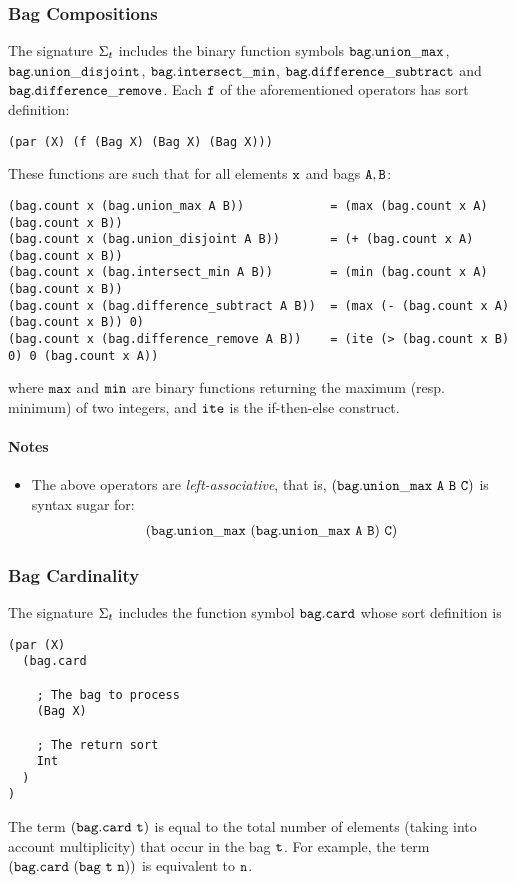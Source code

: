 \documentclass[english,a4paper,10pt]{article}
\begin{document}
\subsubsection{Bag Compositions}
\label{sec:bag-compositions}
The signature $\Sigma_{t}$ includes 
the binary function symbols 
${\tt bag.union\_max}$, ${\tt bag.union\_disjoint}$, 
${\tt bag.intersect\_min}$, ${\tt bag.difference\_subtract}$ and
${\tt bag.difference\_remove}$.
Each ${\tt f}$ of the aforementioned operators
has sort definition:
\begin{verbatim}
(par (X) (f (Bag X) (Bag X) (Bag X)))
\end{verbatim}
These functions are such that for all elements ${\tt x}$
and bags ${\tt A,B}$:
\begin{verbatim}
(bag.count x (bag.union_max A B))            = (max (bag.count x A) (bag.count x B))
(bag.count x (bag.union_disjoint A B))       = (+ (bag.count x A) (bag.count x B))
(bag.count x (bag.intersect_min A B))        = (min (bag.count x A) (bag.count x B))
(bag.count x (bag.difference_subtract A B))  = (max (- (bag.count x A) (bag.count x B)) 0)
(bag.count x (bag.difference_remove A B))    = (ite (> (bag.count x B) 0) 0 (bag.count x A))
\end{verbatim}
where ${\tt max}$ and ${\tt min}$ are binary functions
returning the maximum (resp. minimum) of two integers, and ${\tt ite}$
is the if-then-else construct.

\paragraph{Notes}
\begin{itemize}
\item
The above operators are \emph{left-associative}, that is,
${\tt (bag.union\_max\ A\ B\ C)}$ is syntax sugar for:
\begin{align*}
{\tt (bag.union\_max\ (bag.union\_max\ A\ B)\ C)}
\end{align*}
\end{itemize}

\subsubsection{Bag Cardinality}
The signature $\Sigma_{t}$ includes 
the function symbol ${\tt bag.card}$ whose sort definition is
\begin{verbatim}
(par (X) 
  (bag.card 
  
    ; The bag to process
    (Bag X) 
    
    ; The return sort
    Int
  )
)
\end{verbatim}
The term ${\tt (bag.card\ t)}$ is equal to
the total number of elements (taking into account multiplicity)
that occur in the bag ${\tt t}$.
For example, the term $\syntax{(bag.card\ (bag\ t\ n))}$ is
equivalent to ${\tt n}$.
\end{document}
